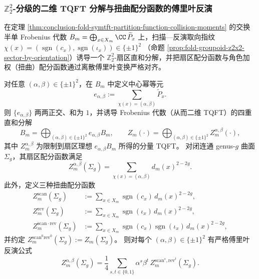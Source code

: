 \subsubsection{\texorpdfstring{$\mathbb Z_2^2$-分级的二维 TQFT 分解与扭曲配分函数的傅里叶反演}{Z2xZ2-分级的二维 TQFT 分解与扭曲配分函数的傅里叶反演}}\label{subsubsec:conclusion-z2x2-sector-tqft-fourier-inversion}
在定理 \ref{thm:conclusion-fold-symtft-partition-function-collision-moments} 的交换半单 Frobenius 代数 \(B_m=\bigoplus_{x\in X_m}\CC\,\widetilde P_x\) 上，扫描—反演取向指纹
\(
\chi(x)=(\operatorname{sgn}(c_x),\operatorname{sgn}(\iota_x))\in\{\pm1\}^2
\)
（命题 \ref{prop:fold-groupoid-z2x2-sector-by-orientation}）诱导一个 \(\mathbb Z_2^2\)-扇区直和分解，并把扇区配分函数与角色加权（扭曲）配分函数通过离散傅里叶变换严格对齐。

\begin{theorem}\label{thm:conclusion-z2x2-sector-tqft-fourier-inversion}
对任意 \((\alpha,\beta)\in\{\pm1\}^2\)，在 \(B_m\) 中定义中心幂等元
\[
e_{\alpha,\beta}:=\sum_{\chi(x)=(\alpha,\beta)}\widetilde P_x.
\]
则 \(\{e_{\alpha,\beta}\}\) 两两正交、和为 \(1\)，并诱导 Frobenius 代数（从而二维 TQFT）的四重直和分解
\[
B_m=\bigoplus_{(\alpha,\beta)\in\{\pm1\}^2}e_{\alpha,\beta}B_m,
\qquad
Z_m(\cdot)=\bigoplus_{(\alpha,\beta)\in\{\pm1\}^2}Z_m^{\alpha,\beta}(\cdot),
\]
其中 \(Z_m^{\alpha,\beta}\) 为限制到扇区理想 \(e_{\alpha,\beta}B_m\) 所得的分量 TQFT。
对闭连通 genus-\(g\) 曲面 \(\Sigma_g\)，其扇区配分函数满足
\[
Z_m^{\alpha,\beta}(\Sigma_g)
=
\sum_{\chi(x)=(\alpha,\beta)}d_m(x)^{2-2g}.
\]
此外，定义三种扭曲配分函数
\[
\begin{aligned}
Z_m^{\mathrm{scan}}(\Sigma_g)
&:=
\sum_{x\in X_m}\operatorname{sgn}(c_x)\,d_m(x)^{2-2g},\\
Z_m^{\mathrm{rev}}(\Sigma_g)
&:=
\sum_{x\in X_m}\operatorname{sgn}(\iota_x)\,d_m(x)^{2-2g},\\
Z_m^{\mathrm{scan\cdot rev}}(\Sigma_g)
&:=
\sum_{x\in X_m}\operatorname{sgn}(c_x)\operatorname{sgn}(\iota_x)\,d_m(x)^{2-2g},
\end{aligned}
\]
并约定 \(Z_m^{\mathrm{scan}^0\mathrm{rev}^0}(\Sigma_g):=Z_m(\Sigma_g)\)。
则对每个 \((\alpha,\beta)\in\{\pm1\}^2\) 有严格傅里叶反演公式
\[
Z_m^{\alpha,\beta}(\Sigma_g)
=
\frac14\sum_{s,t\in\{0,1\}}\alpha^{s}\beta^{t}\,
Z_m^{\mathrm{scan}^{s},\mathrm{rev}^{t}}(\Sigma_g).
\]
\end{theorem}

